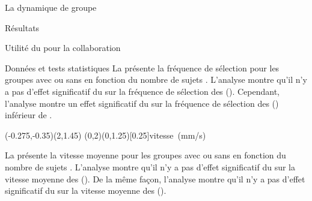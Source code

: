 \documentclass[myfrancais,ngerman,english,french]{mythesis}
\begin{document}
\begin{mychapter}{La dynamique de groupe}
\begin{mysection}{Résultats}
\begin{mysubsection}{Utilité du \mybrainstorming pour la collaboration}
\begin{mysubsubsection}{Données et tests statistiques}
					La  présente la fréquence de sélection  pour les groupes avec ou sans \mybrainstorming {} en fonction du nombre de sujets .
					L'analyse montre qu'il n'y a pas d'effet significatif du \mybrainstorming {} sur la fréquence de sélection  des  ().
					Cependant, l'analyse montre un effet significatif du \mybrainstorming {} sur la fréquence de sélection  des  () inférieur de .

					\begin{myfigure}
						\begin{myps}(-0.275,-0.35)(2,1.45)
							\myaxes(0,2){\mybrainstorming}(0,1.25)[0.25]{vitesse~(mm/s)}
						\end{myps}
					\end{myfigure}

					La  présente la vitesse moyenne  pour les groupes avec ou sans \mybrainstorming {} en fonction du nombre de sujets .
					L'analyse montre qu'il n'y a pas d'effet significatif du \mybrainstorming {} sur la vitesse moyenne  des  ().
					De la même façon, l'analyse montre qu'il n'y a pas d'effet significatif du \mybrainstorming {} sur la vitesse moyenne  des  ().


\end{mysubsubsection}
\end{mysubsection}
\end{mysection}
\end{mychapter}
\end{document}
